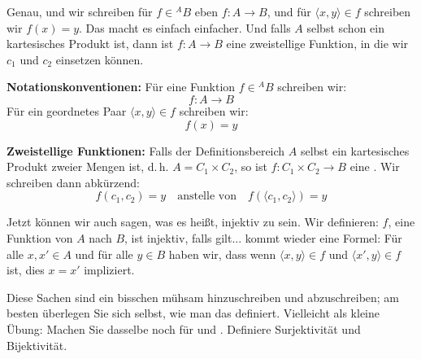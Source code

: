 \begin{spoken-clean}[01:02:54 - 01:04:01]
Genau, und wir schreiben für $f \in {}^A B$ eben $f \colon A \to B$, und für $\langle x, y \rangle \in f$ schreiben wir $f(x) = y$. Das macht es einfach einfacher. Und falls $A$ selbst schon ein kartesisches Produkt ist, dann ist $f \colon A \to B$ eine zweistellige Funktion, in die wir $c_1$ und $c_2$ einsetzen können.
\end{spoken-clean}

\begin{math-stroke}
\textbf{Notationskonventionen:}
Für eine Funktion $f \in {}^A B$ schreiben wir:
\[
f \colon A \to B
\]
Für ein geordnetes Paar $\langle x, y \rangle \in f$ schreiben wir:
\[
f(x) = y
\]

\textbf{Zweistellige Funktionen:}
Falls der Definitionsbereich $A$ selbst ein kartesisches Produkt zweier Mengen ist, d.\,h. $A = C_1 \times C_2$, so ist $f \colon C_1 \times C_2 \to B$ eine . Wir schreiben dann abkürzend:
\[
f(c_1, c_2) = y \quad \text{anstelle von} \quad f(\langle c_1, c_2 \rangle) = y
\]
\end{math-stroke}

\begin{spoken-clean}[01:04:01 - 01:05:16]
Jetzt können wir auch sagen, was es heißt, injektiv zu sein. Wir definieren: $f$, eine Funktion von $A$ nach $B$, ist injektiv, falls gilt... kommt wieder eine Formel: Für alle $x, x' \in A$ und für alle $y \in B$ haben wir, dass wenn $\langle x, y \rangle \in f$ und $\langle x', y \rangle \in f$ ist, dies $x = x'$ impliziert.

Diese Sachen sind ein bisschen mühsam hinzuschreiben und abzuschreiben; am besten überlegen Sie sich selbst, wie man das definiert. Vielleicht als kleine Übung: Machen Sie dasselbe noch für  und . Definiere Surjektivität und Bijektivität.
\end{spoken-clean}

\begin{math-stroke}[Injektivität]
\end{math-stroke}

